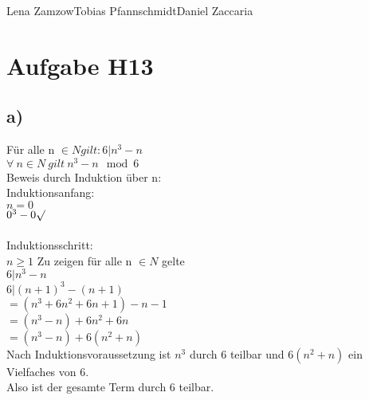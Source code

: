 \documentclass[11pt,a4paper]{article}
\begin{document}
                {Lena Zamzow}{Tobias Pfannschmidt}{Daniel Zaccaria}{}{}



\section*{Aufgabe H13}

\subsection*{a)}
Für alle n $ \in N gilt: 6 |  n^3-n $ \\
$\forall~n \in N~ gilt~ n^3-n \mod 6$\\
Beweis durch Induktion über n:\\
Induktionsanfang:\\
$n=0$\\
$0^3-0 \surd$\\
\\
Induktionsschritt:\\
$n\geq1$ Zu zeigen für alle n $\in N$ gelte\\
$6|n^3-n $  \\
$6|(n+1)^3-(n+1)$\\
$=(n^3+6n^2+6n+1)-n-1$\\
$=(n^3-n)+6n^2+6n$\\
$=(n^3-n)+6(n^2+n)$\\
Nach Induktionsvoraussetzung ist $n^3$ durch 6 teilbar und $6(n^2+n)$ ein Vielfaches von 6.\\
Also ist der gesamte Term durch 6 teilbar.\\
\end{document}
